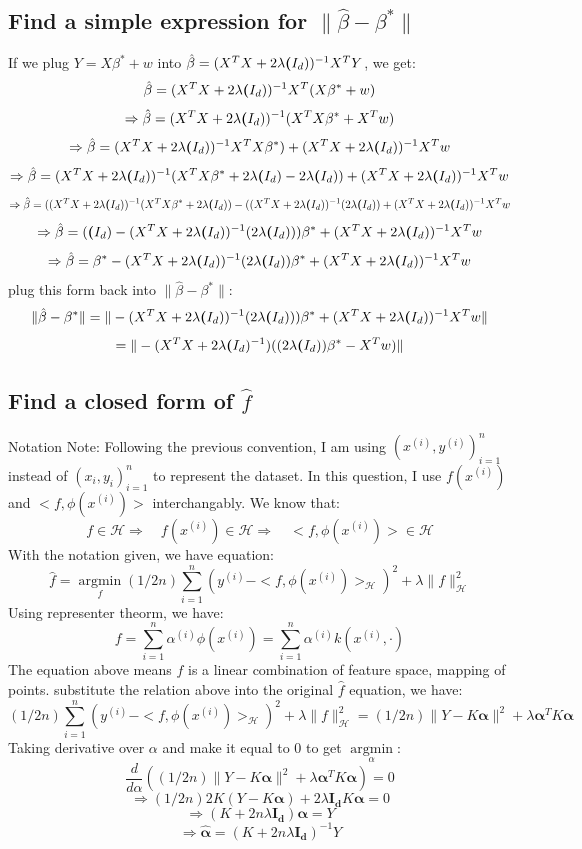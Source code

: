\documentclass[twoside]{article}
\theoremstyle{definition}
\theoremstyle{definition}
\theoremstyle{remark}
\def\H{{\mathcal H}}
\begin{document}
\subsection{Find a simple expression for $\| \hat \beta - \beta^* \|$}
If we plug $Y = X\beta^*+w$ into $ \hat \beta = (X^TX + 2\lambda\textbf(I_d))^{-1}X^TY$, we get:
\[  \hat \beta = (X^TX + 2\lambda\textbf(I_d))^{-1}X^T ( X\beta^*+w)\]
\[ \Rightarrow   \hat \beta = (X^TX + 2\lambda\textbf(I_d))^{-1}(X^T  X\beta^*+X^Tw)\]
\[ \Rightarrow \hat \beta = (X^TX + 2\lambda\textbf(I_d))^{-1}X^T  X\beta^*) + (X^TX + 2\lambda\textbf(I_d))^{-1}X^Tw \]
\[ \Rightarrow \hat \beta = (X^TX + 2\lambda\textbf(I_d))^{-1}(X^T  X\beta^* + 2\lambda\textbf(I_d)-2\lambda\textbf(I_d)) + (X^TX + 2\lambda\textbf(I_d))^{-1}X^Tw \]
\[ \Rightarrow \hat \beta = ((X^TX + 2\lambda\textbf(I_d))^{-1}(X^T  X\beta^* + 2\lambda\textbf(I_d))-( (X^TX +2\lambda\textbf(I_d))^{-1}(2\lambda\textbf(I_d)) + (X^TX + 2\lambda\textbf(I_d))^{-1}X^Tw \]
\[ \Rightarrow \hat \beta = (\textbf(I_d)- (X^TX +2\lambda\textbf(I_d))^{-1}(2\lambda\textbf(I_d)))\beta^* + (X^TX + 2\lambda\textbf(I_d))^{-1}X^Tw \]
\[ \Rightarrow \hat \beta = \beta^* - (X^TX +2\lambda\textbf(I_d))^{-1}(2\lambda\textbf(I_d))\beta^* + (X^TX + 2\lambda\textbf(I_d))^{-1}X^Tw \]
plug this form back into $\| \hat \beta - \beta^* \|$:
\[\| \hat \beta - \beta^* \| = \|- (X^TX +2\lambda\textbf(I_d))^{-1}(2\lambda\textbf(I_d)))\beta^* + (X^TX + 2\lambda\textbf(I_d))^{-1}X^Tw\|\]
\[ = \|- (X^TX +2\lambda\textbf(I_d)^{-1})((2\lambda\textbf(I_d))\beta^*-X^Tw)\|\]





\subsection{Find a closed form of $\hat f$}
Notation Note: Following the previous convention, I am using ${(x^{(i)},y^{(i)})}_{i=1}^n$ instead of ${(x_i,y_i)}_{i=1}^n$ to represent the dataset.
In this question, I use $f(x^{(i)})$ and $<f, \phi(x^{(i)})>$ interchangably. 
We know that:
\[ f \in \H \Rightarrow \quad f(x^{(i)}) \in \H \Rightarrow \quad <f, \phi(x^{(i)})> \in \H\]
With the notation given, we have equation:
\[ \hat f = \underset{f}{\operatorname{argmin}}(1/2n) \sum_{i=1}^n (y^{(i)} -  <f, \phi(x^{(i)})>_\H)^2 + \lambda \|f\|_\H^2\]
Using representer theorm, we have:
\[ f = \sum_{i=1}^n\alpha^{(i)}\phi(x^{(i)})= \sum_{i=1}^n\alpha^{(i)}k(x^{(i)},\cdot)\]
The equation above means $f$ is a linear combination of feature space, mapping of points. substitute the relation above into the original $\hat f$ equation, we have:
\[(1/2n) \sum_{i=1}^n (y^{(i)} -  <f, \phi(x^{(i)})>_\H)^2 + \lambda \|f\|_\H^2=(1/2n)\|Y-K\boldsymbol\alpha\|^2+\lambda\boldsymbol\alpha^TK\boldsymbol\alpha\]
Taking derivative over $\alpha$ and make it equal to 0 to get $\underset{\alpha}{\operatorname{argmin}}$:
\[\frac{d}{d\alpha}((1/2n)\|Y-K\boldsymbol\alpha\|^2+\lambda\boldsymbol\alpha^TK\boldsymbol\alpha) = 0\]
\[\Rightarrow(1/2n) 2K(Y - K\boldsymbol\alpha)+2\lambda\mathbf{I_d}K\boldsymbol\alpha = 0\]
\[\Rightarrow (K+ 2n\lambda\mathbf{I_d})\boldsymbol\alpha = Y\]
\[\Rightarrow \boldsymbol{\hat \alpha} = (K +  2n\lambda\mathbf{I_d})^{-1}Y\]
\end{document}
